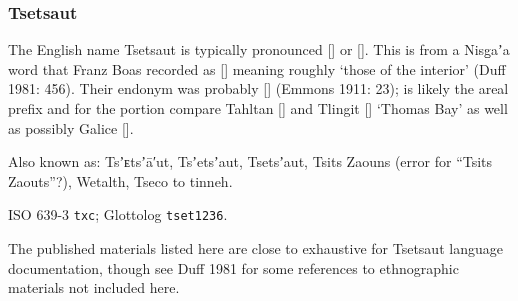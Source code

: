 \documentclass[12pt,letterpaper,oneside,article]{memoir}
\begin{document}
\subsubsection{Tsetsaut}\label{sec:tsetsaut}

The English name Tsetsaut is typically pronounced [] or [].
This is from a Nisg̱aʼa word  that Franz Boas recorded as  [] meaning roughly ‘those of the interior’ (Duff 1981: 456).
Their endonym was probably  [] (Emmons 1911: 23);  is likely the areal prefix and for the  portion compare Tahltan  [] and Tlingit  [] ‘Thomas Bay’ as well as possibly Galice  [].

Also known as: Tsʼᴇtsʼā′ut, Tsʼetsʼaut, Tsetsʼaut, Tsits Zaouns (error for “Tsits Zaouts”?), Wetalth, Tseco to tinneh.

ISO 639-3 \texttt{txc}; Glottolog \texttt{tset1236}.

The published materials listed here are close to exhaustive for Tsetsaut language documentation, though see Duff 1981 for some references to ethnographic materials not included here.
\end{document}
